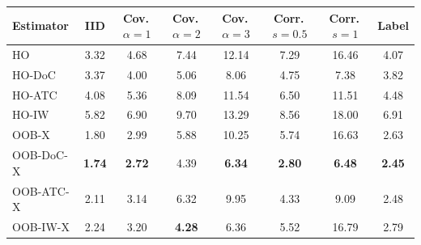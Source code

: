 \begin{tabular}{lccccccc}
\toprule
Estimator & IID & Cov.\,$\alpha{=}1$ & Cov.\,$\alpha{=}2$ & Cov.\,$\alpha{=}3$ & Corr.\,$s{=}0.5$ & Corr.\,$s{=}1$ & Label \\
\midrule
HO & 3.32 & 4.68 & 7.44 & 12.14 & 7.29 & 16.46 & 4.07 \\
HO\mbox{-}DoC & 3.37 & 4.00 & 5.06 & 8.06 & 4.75 & 7.38 & 3.82 \\
HO\mbox{-}ATC & 4.08 & 5.36 & 8.09 & 11.54 & 6.50 & 11.51 & 4.48 \\
HO\mbox{-}IW & 5.82 & 6.90 & 9.70 & 13.29 & 8.56 & 18.00 & 6.91 \\
OOB\mbox{-}X & 1.80 & 2.99 & 5.88 & 10.25 & 5.74 & 16.63 & 2.63 \\
OOB\mbox{-}DoC\mbox{-}X & \textbf{1.74} & \textbf{2.72} & 4.39 & \textbf{6.34} & \textbf{2.80} & \textbf{6.48} & \textbf{2.45} \\
OOB\mbox{-}ATC\mbox{-}X & 2.11 & 3.14 & 6.32 & 9.95 & 4.33 & 9.09 & 2.48 \\
OOB\mbox{-}IW\mbox{-}X & 2.24 & 3.20 & \textbf{4.28} & 6.36 & 5.52 & 16.79 & 2.79 \\
\bottomrule
\end{tabular}